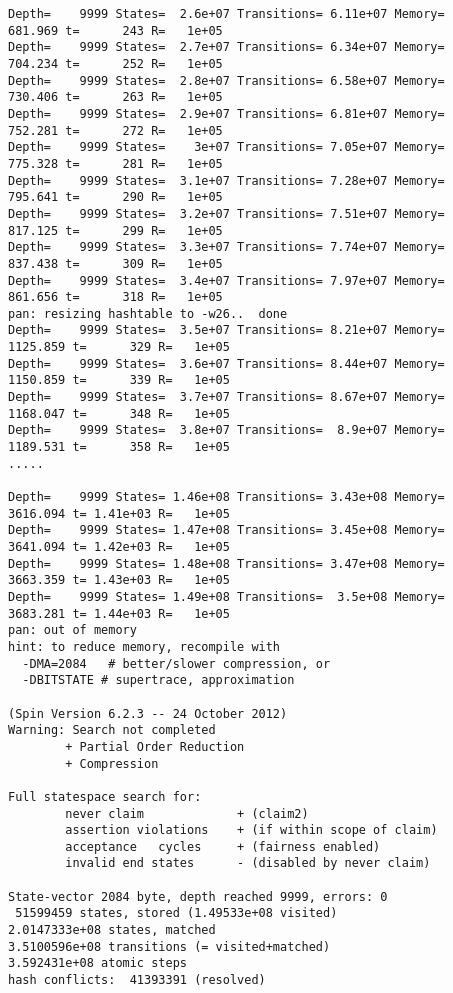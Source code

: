 \documentclass{llncs}
\begin{document}
\begin{lstlisting}
Depth=    9999 States=  2.6e+07 Transitions= 6.11e+07 Memory=   681.969 t=      243 R=   1e+05
Depth=    9999 States=  2.7e+07 Transitions= 6.34e+07 Memory=   704.234 t=      252 R=   1e+05
Depth=    9999 States=  2.8e+07 Transitions= 6.58e+07 Memory=   730.406 t=      263 R=   1e+05
Depth=    9999 States=  2.9e+07 Transitions= 6.81e+07 Memory=   752.281 t=      272 R=   1e+05
Depth=    9999 States=    3e+07 Transitions= 7.05e+07 Memory=   775.328 t=      281 R=   1e+05
Depth=    9999 States=  3.1e+07 Transitions= 7.28e+07 Memory=   795.641 t=      290 R=   1e+05
Depth=    9999 States=  3.2e+07 Transitions= 7.51e+07 Memory=   817.125 t=      299 R=   1e+05
Depth=    9999 States=  3.3e+07 Transitions= 7.74e+07 Memory=   837.438 t=      309 R=   1e+05
Depth=    9999 States=  3.4e+07 Transitions= 7.97e+07 Memory=   861.656 t=      318 R=   1e+05
pan: resizing hashtable to -w26..  done
Depth=    9999 States=  3.5e+07 Transitions= 8.21e+07 Memory=  1125.859 t=      329 R=   1e+05
Depth=    9999 States=  3.6e+07 Transitions= 8.44e+07 Memory=  1150.859 t=      339 R=   1e+05
Depth=    9999 States=  3.7e+07 Transitions= 8.67e+07 Memory=  1168.047 t=      348 R=   1e+05
Depth=    9999 States=  3.8e+07 Transitions=  8.9e+07 Memory=  1189.531 t=      358 R=   1e+05
.....

Depth=    9999 States= 1.46e+08 Transitions= 3.43e+08 Memory=  3616.094 t= 1.41e+03 R=   1e+05
Depth=    9999 States= 1.47e+08 Transitions= 3.45e+08 Memory=  3641.094 t= 1.42e+03 R=   1e+05
Depth=    9999 States= 1.48e+08 Transitions= 3.47e+08 Memory=  3663.359 t= 1.43e+03 R=   1e+05
Depth=    9999 States= 1.49e+08 Transitions=  3.5e+08 Memory=  3683.281 t= 1.44e+03 R=   1e+05
pan: out of memory
hint: to reduce memory, recompile with
  -DMA=2084   # better/slower compression, or
  -DBITSTATE # supertrace, approximation

(Spin Version 6.2.3 -- 24 October 2012)
Warning: Search not completed
        + Partial Order Reduction
        + Compression

Full statespace search for:
        never claim             + (claim2)
        assertion violations    + (if within scope of claim)
        acceptance   cycles     + (fairness enabled)
        invalid end states      - (disabled by never claim)

State-vector 2084 byte, depth reached 9999, errors: 0
 51599459 states, stored (1.49533e+08 visited)
2.0147333e+08 states, matched
3.5100596e+08 transitions (= visited+matched)
3.592431e+08 atomic steps
hash conflicts:  41393391 (resolved)


\end{lstlisting}
\end{document}
